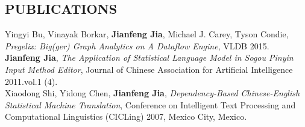 \documentclass{res}
\begin{document}
\begin{resume}
\section{PUBLICATIONS}
     Yingyi Bu, Vinayak Borkar, \textbf{Jianfeng Jia}, Michael J. Carey, Tyson Condie, \emph{Pregelix: Big(ger) Graph Analytics on A Dataflow Engine}, VLDB 2015.\\
     \textbf{Jianfeng Jia}, \emph{The Application of Statistical Language Model in Sogou Pinyin Input Method Editor}, Journal of Chinese Association for Artificial Intelligence 2011.vol.1 (4).\\
     Xiaodong Shi, Yidong Chen, \textbf{Jianfeng Jia}, \emph{Dependency-Based Chinese-English Statistical Machine Translation}, Conference on Intelligent Text Processing and Computational Linguistics (CICLing) 2007, Mexico City, Mexico.\\

\end{resume}
\end{document}

